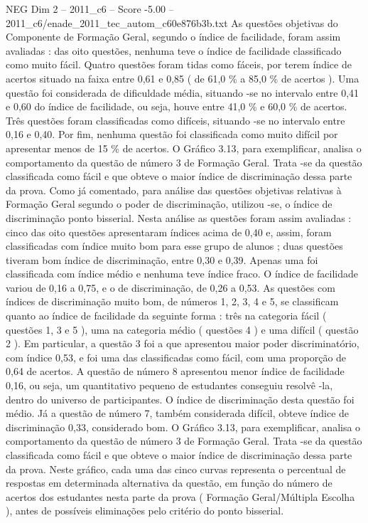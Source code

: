 \begin{textsample}{NEG Dim 2 – 2011\_c6 – Score -5.00 – 2011\_c6/enade\_2011\_tec\_autom\_c60e876b3b.txt}
As questões objetivas do Componente de Formação Geral, segundo o índice de facilidade, foram assim avaliadas : das oito questões, nenhuma teve o índice de facilidade classificado como muito fácil.
Quatro questões foram tidas como fáceis, por terem índice de acertos situado na faixa entre 0,61 e 0,85 ( de 61,0 \% a 85,0 \% de acertos ).
Uma questão foi considerada de dificuldade média, situando -se no intervalo entre 0,41 e 0,60 do índice de facilidade, ou seja, houve entre 41,0 \% e 60,0 \% de acertos.
Três questões foram classificadas como difíceis, situando -se no intervalo entre 0,16 e 0,40.
Por fim, nenhuma questão foi classificada como muito difícil por apresentar menos de 15 \% de acertos.
O Gráfico 3.13, para exemplificar, analisa o comportamento da questão de número 3 de Formação Geral.
Trata -se da questão classificada como fácil e que obteve o maior índice de discriminação dessa parte da prova.
Como já comentado, para análise das questões objetivas relativas à Formação Geral segundo o poder de discriminação, utilizou -se, o índice de discriminação ponto bisserial.
Nesta análise as questões foram assim avaliadas : cinco das oito questões apresentaram índices acima de 0,40 e, assim, foram classificadas com índice muito bom para esse grupo de alunos ; duas questões tiveram bom índice de discriminação, entre 0,30 e 0,39.
Apenas uma foi classificada com índice médio e nenhuma teve índice fraco.
O índice de facilidade variou de 0,16 a 0,75, e o de discriminação, de 0,26 a 0,53.
As questões com índices de discriminação muito bom, de números 1, 2, 3, 4 e 5, se classificam quanto ao índice de facilidade da seguinte forma : três na categoria fácil ( questões 1, 3 e 5 ), uma na categoria médio ( questões 4 ) e uma difícil ( questão 2 ).
Em particular, a questão 3 foi a que apresentou maior poder discriminatório, com índice 0,53, e foi uma das classificadas como fácil, com uma proporção de 0,64 de acertos.
A questão de número 8 apresentou menor índice de facilidade 0,16, ou seja, um quantitativo pequeno de estudantes conseguiu resolvê -la, dentro do universo de participantes.
O índice de discriminação desta questão foi médio.
Já a questão de número 7, também considerada difícil, obteve índice de discriminação 0,33, considerado bom.
O Gráfico 3.13, para exemplificar, analisa o comportamento da questão de número 3 de Formação Geral.
Trata -se da questão classificada como fácil e que obteve o maior índice de discriminação dessa parte da prova.
Neste gráfico, cada uma das cinco curvas representa o percentual de respostas em determinada alternativa da questão, em função do número de acertos dos estudantes nesta parte da prova ( Formação Geral/Múltipla Escolha ), antes de possíveis eliminações pelo critério do ponto bisserial.

\end{textsample}
